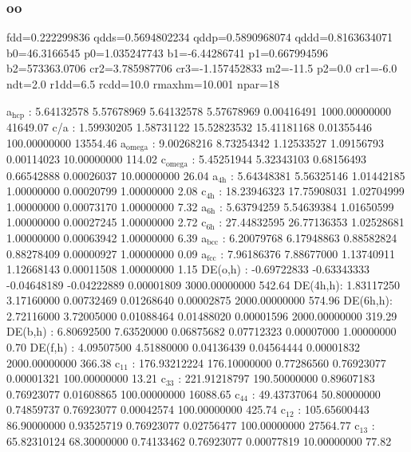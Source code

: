 \documentclass[11pt]{article}
\begin{document}
\subsubsection{oo}
\label{sec:org4346485}
fdd=0.222299836 qdds=0.5694802234 qddp=0.5890968074 qddd=0.8163634071 b0=46.3166545 p0=1.035247743 b1=-6.44286741 p1=0.667994596 b2=573363.0706 cr2=3.785987706 cr3=-1.157452833 m2=-11.5 p2=0.0 cr1=-6.0 ndt=2.0 r1dd=6.5 rcdd=10.0 rmaxhm=10.001 npar=18

a\(_{\text{hcp}}\)   :   5.64132578   5.57678969   5.64132578   5.57678969   0.00416491 1000.00000000     41649.07
c/a     :   1.59930205   1.58731122  15.52823532  15.41181168   0.01355446 100.00000000     13554.46
a\(_{\text{omega}}\) :   9.00268216   8.73254342   1.12533527   1.09156793   0.00114023  10.00000000       114.02
c\(_{\text{omega}}\) :   5.45251944   5.32343103   0.68156493   0.66542888   0.00026037  10.00000000        26.04
a\(_{\text{4h}}\)    :   5.64348381   5.56325146   1.01442185   1.00000000   0.00020799   1.00000000         2.08
c\(_{\text{4h}}\)    :  18.23946323  17.75908031   1.02704999   1.00000000   0.00073170   1.00000000         7.32
a\(_{\text{6h}}\)    :   5.63794259   5.54639384   1.01650599   1.00000000   0.00027245   1.00000000         2.72
c\(_{\text{6h}}\)    :  27.44832595  26.77136353   1.02528681   1.00000000   0.00063942   1.00000000         6.39
a\(_{\text{bcc}}\)   :   6.20079768   6.17948863   0.88582824   0.88278409   0.00000927   1.00000000         0.09
a\(_{\text{fcc}}\)   :   7.96186376   7.88677000   1.13740911   1.12668143   0.00011508   1.00000000         1.15
DE(o,h) :  -0.69722833  -0.63343333  -0.04648189  -0.04222889   0.00001809 3000.00000000       542.64
DE(4h,h):   1.83117250   3.17160000   0.00732469   0.01268640   0.00002875 2000.00000000       574.96
DE(6h,h):   2.72116000   3.72005000   0.01088464   0.01488020   0.00001596 2000.00000000       319.29
DE(b,h) :   6.80692500   7.63520000   0.06875682   0.07712323   0.00007000   1.00000000         0.70
DE(f,h) :   4.09507500   4.51880000   0.04136439   0.04564444   0.00001832 2000.00000000       366.38
c\(_{\text{11}}\)    : 176.93212224 176.10000000   0.77286560   0.76923077   0.00001321 100.00000000        13.21
c\(_{\text{33}}\)    : 221.91218797 190.50000000   0.89607183   0.76923077   0.01608865 100.00000000     16088.65
c\(_{\text{44}}\)    :  49.43737064  50.80000000   0.74859737   0.76923077   0.00042574 100.00000000       425.74
c\(_{\text{12}}\)    : 105.65600443  86.90000000   0.93525719   0.76923077   0.02756477 100.00000000     27564.77
c\(_{\text{13}}\)    :  65.82310124  68.30000000   0.74133462   0.76923077   0.00077819  10.00000000        77.82
\end{document}
